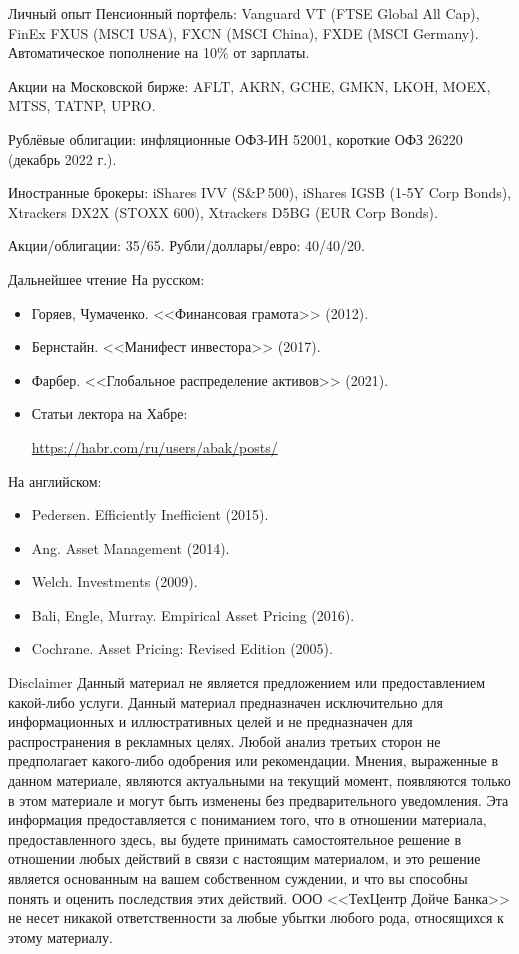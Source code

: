 \documentclass{beamer}
\newcommand{\insertdisclaimerframe}{
		\begin{frame}{Disclaimer}
			\small
			\justify
			Данный материал не является предложением или предоставлением
			какой-либо услуги. Данный материал предназначен исключительно для
			информационных и иллюстративных целей и не предназначен для
			распространения в рекламных целях. Любой анализ третьих сторон не 		
			предполагает какого-либо одобрения или рекомендации. Мнения, 
			выраженные в	данном материале, являются актуальными на текущий момент,
			появляются только в этом материале и могут быть изменены без 
			предварительного уведомления. Эта информация предоставляется с 
			пониманием того, что в отношении материала, предоставленного здесь, вы
			будете принимать самостоятельное решение в отношении любых действий в
			связи с настоящим материалом, и это решение является основанным на 
			вашем	собственном суждении, и что вы способны понять и оценить 
			последствия этих действий. ООО <<ТехЦентр Дойче Банка>> не несет 
			никакой ответственности за любые убытки любого рода, относящихся к
			 этому материалу.
		\end{frame}
	}
\newcommand{\insertdisclaimerframe}{
	}
\begin{document}
\begin{frame}{Личный опыт}
\justify
Пенсионный портфель: Vanguard VT (FTSE Global All Cap), FinEx FXUS (MSCI USA), FXCN (MSCI China), FXDE (MSCI Germany). Автоматическое пополнение на 10\% от зарплаты.

\justify
Акции на Московской бирже: AFLT, AKRN, GCHE, GMKN, LKOH, MOEX, MTSS, TATNP, UPRO.

\justify
Рублёвые облигации: инфляционные ОФЗ-ИН 52001, короткие ОФЗ 26220 (декабрь 2022 г.).

\justify
Иностранные брокеры: iShares IVV (S\&P\,500), iShares IGSB (1-5Y Corp Bonds), Xtrackers 
DX2X (STOXX 600), Xtrackers D5BG (EUR Corp Bonds).

\justify
Акции/облигации: 35/65. Рубли/доллары/евро: 40/40/20.
\end{frame}



\begin{frame}{Дальнейшее чтение}
На русском:
\begin{itemize}
\justifying
\item Горяев, Чумаченко. <<Финансовая грамота>> (2012).
\item Бернстайн. <<Манифест инвестора>> (2017).
\item Фарбер. <<Глобальное распределение активов>> (2021).
\item Статьи лектора на Хабре:

\url{https://habr.com/ru/users/abak/posts/}
\end{itemize}
На английском:
\begin{itemize}
\item Pedersen. Efficiently Inefficient (2015).
\item Ang. Asset Management (2014).
\item Welch. Investments (2009).
\item Bali, Engle, Murray. Empirical Asset Pricing (2016).
\item Cochrane. Asset Pricing: Revised Edition (2005).

\end{itemize}
\end{frame}


\insertdisclaimerframe
\end{document}
